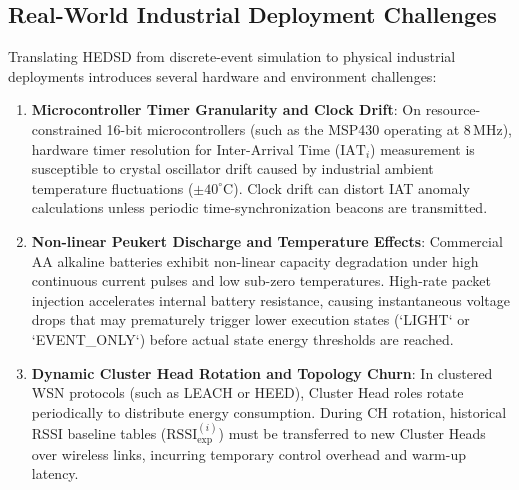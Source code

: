 \documentclass[conference]{IEEEtran}
\begin{document}
\begin{enumerate}
\subsection{Real-World Industrial Deployment Challenges}
Translating HEDSD from discrete-event simulation to physical industrial deployments introduces several hardware and environment challenges:
\begin{enumerate}
    \item \textbf{Microcontroller Timer Granularity and Clock Drift}: On resource-constrained 16-bit microcontrollers (such as the MSP430 operating at $8\,\text{MHz}$), hardware timer resolution for Inter-Arrival Time ($\text{IAT}_i$) measurement is susceptible to crystal oscillator drift caused by industrial ambient temperature fluctuations ($\pm 40^\circ\text{C}$). Clock drift can distort IAT anomaly calculations unless periodic time-synchronization beacons are transmitted.
    \item \textbf{Non-linear Peukert Discharge and Temperature Effects}: Commercial AA alkaline batteries exhibit non-linear capacity degradation under high continuous current pulses and low sub-zero temperatures. High-rate packet injection accelerates internal battery resistance, causing instantaneous voltage drops that may prematurely trigger lower execution states (`LIGHT` or `EVENT\_ONLY`) before actual state energy thresholds are reached.
    \item \textbf{Dynamic Cluster Head Rotation and Topology Churn}: In clustered WSN protocols (such as LEACH or HEED), Cluster Head roles rotate periodically to distribute energy consumption. During CH rotation, historical RSSI baseline tables ($\text{RSSI}_{\text{exp}}^{(i)}$) must be transferred to new Cluster Heads over wireless links, incurring temporary control overhead and warm-up latency.
\end{enumerate}


\end{enumerate}
\end{document}

